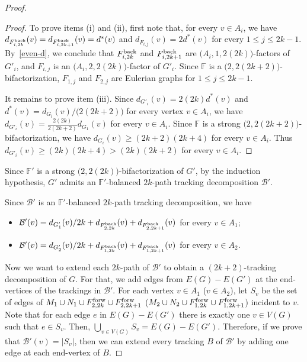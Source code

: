 \documentclass[12pt,reqno,a4paper]{amsart}
\def\back{\mathop{\text{\rm back}}\nolimits}
\def\forw{\mathop{\text{\rm forw}}\nolimits}
\newcommand{\B}{\mathcal{B}}
\begin{document}
\begin{proof}
\begin{proof}
To prove items (i) and (ii), first note that, for every $v\in A_i$, we have
 \(d_{F_{i,2k}^{\back}}(v) = d_{F_{i,2k+1}^{\back}}(v) = d^*(v)\) 
and \(d_{F_{i,j}}(v) = 2d^*(v)\) for every \(1\leq j\leq 2k-1\). 
By~\eqref{even-d}, we conclude that \(F_{i,2k}^{\back}\) and 
\(F_{i,2k+1}^{\back}\) are \(\big(A_i,1,2(2k)\big)\)-factors of \(G'_i\), and 
\(F_{i,j}\) is an \(\big(A_i,2,2(2k)\big)\)-factor of \(G'_i\).
Since \(\mathbb{F}\) is a \(\big(2,2(2k+2)\big)\)-bifactorization,
\(F_{1,j}\) and \(F_{2,j}\) are Eulerian graphs for 
\(1\leq j\leq 2k-1\).

It remains to prove item (iii). 
Since \(d_{G'_i}(v) = 2(2k)d^*(v)\) and \(d^*(v) = d_{G_i}(v)/\big(2(2k+2)\big)\) 
for every vertex \(v\in A_i\),
we have \(d_{G'_i}(v) = \frac{2(2k)}{2(2k+2)}d_{G_1}(v)\) for every \(v\in 
A_i\).
Since \(\mathbb{F}\) is a strong \(\big(2,2(2k+2)\big)\)-bifactorization, 
we have \(d_{G_i}(v) \geq (2k+2)(2k+4)\) for every \(v\in A_i\).
Thus \(d_{G'_i}(v) \geq (2k)(2k+4) > (2k)(2k+2)\) for every \(v\in A_i\).
\end{proof}

Since \(\mathbb{F}'\) is a strong \(\big(2,2(2k)\big)\)-bifactorization of \(G'\),
by the induction hypothesis, \(G'\) admits an \(\mathbb{F}'\)-balanced 
$2k$-path tracking decomposition \(\B'\).

Since \(\B'\) is an \(\mathbb{F}'\)-balanced $2k$-path tracking decomposition, we have 
	\begin{itemize}
		\item \(\B'(v) = d_{G'_1}(v)/2k
			+ d_{F_{2,2k}^{\back}}(v)
			+ d_{F_{2,2k+1}^{\back}}(v)\) for every \(v\in A_1\);
		\item \(\B'(v) = d_{G'_2}(v)/2k
			+ d_{F_{1,2k}^{\back}}(v)
			+ d_{F_{1,2k+1}^{\back}}(v)\) for every \(v\in A_2\).
	\end{itemize}
Now we want to extend each $2k$-path of \(\B'\) to obtain a \((2k+2)\)-tracking decomposition of $G$. 
For that, we add edges from 
\(E(G)-E(G')\) at the end-vertices of the trackings in $\B'$.
For each vertex \(v\in A_1\) ($v\in A_2$), let \(S_v\) be the set of edges 
of \(M_1\cup N_1 \cup F_{2,2k}^{\forw}\cup F_{2,2k+1}^{\forw}\) (\(M_2\cup N_2 
\cup F_{1,2k}^{\forw}\cup F_{1,2k+1}^{\forw}\)) incident to \(v\).
Note that for each edge \(e\) in \(E(G)-E(G')\) there is exactly 
one \(v\in V(G)\) such that \(e\in S_v\).
Then, \(\bigcup_{v\in V(G)} S_v=E(G) - E(G')\). Therefore, if we prove that 
\(\B'(v) = |S_v|\), then we can extend every tracking $B$ of $\B'$ by adding 
one edge at each end-vertex of $B$.


\end{proof}
\end{document}
